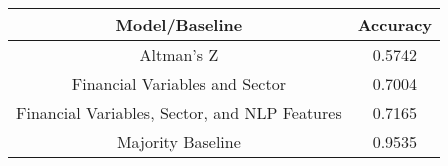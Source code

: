 \footnotesize
\begin{tabular}{cc}
\toprule
Model/Baseline & Accuracy \\
\midrule
Altman's Z & 0.5742 \\
Financial Variables and Sector & 0.7004 \\
Financial Variables, Sector, and NLP Features & 0.7165 \\
Majority Baseline & 0.9535 \\
\bottomrule
\end{tabular}

\normalsize
